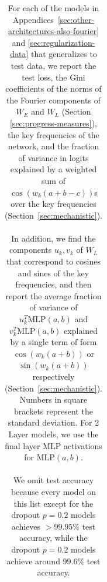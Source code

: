 \documentclass{article} %
\newcommand{\cosp}[1]{\cos \left ( #1 \right )}
\newcommand{\sinp}[1]{\sin \left ( #1 \right )}
\newcommand{\MLP}{\textrm{MLP}}
\begin{document}
\begin{table}[]
\begin{tabular}{c|c|c|c|c|c|c}
    \end{tabular}
    \caption{
    For each of the models in Appendices~\ref{sec:other-architectures-also-fourier} and \ref{sec:regularization-data} that generalizes to test data, we report the test loss, the Gini coefficients of the norms of the Fourier components of $W_E$ and $W_L$ (Section \ref{sec:progress-measures}), the key frequencies of the network, and the fraction of variance in logits explained by a weighted sum of $\cosp{w_k (a+b-c)}$s over the key frequencies (Section~\ref{sec:mechanistic}).\\\\
    In addition,  we find the components $u_k, v_k$ of $W_L$ that correspond to cosines and sines of the key frequencies, and then report the average fraction of variance of $u_k^T \MLP(a,b)$ and $v_k^T \MLP(a,b)$ explained by a single term of form $\cosp{w_k (a+b)}$ or $\sinp{w_k(a+b)}$ respectively (Section~\ref{sec:mechanistic}). Numbers in square brackets represent the standard deviation.  For 2 Layer models, we use the final layer MLP activations for $\MLP(a,b)$.\\\\
   We omit test accuracy because every model on this list except for the dropout $p=0.2$ models achieves $>99.95\%$ test accuracy, while the dropout $p=0.2$ models achieve around $99.6\%$ test accuracy.}
    \label{tab:other-architectures}
\end{table}
\end{document}
